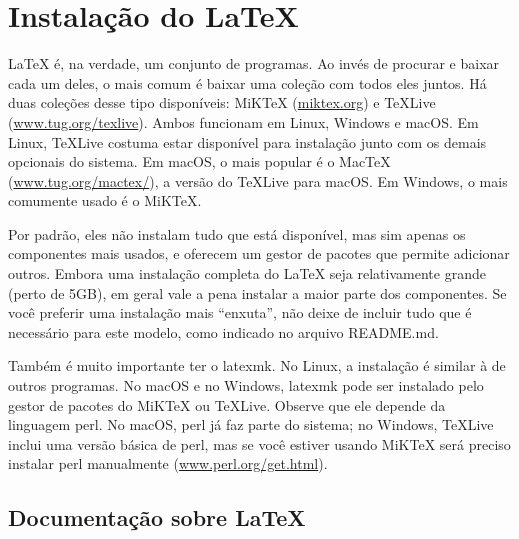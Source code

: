 
\chapter{Instalação do \LaTeX{}}
\label{chap:install}

\LaTeX{} é, na verdade, um conjunto de programas. Ao invés de procurar e
baixar cada um deles, o mais comum é baixar uma coleção com todos eles juntos.
Há duas coleções desse tipo disponíveis: MiK\TeX{} (\url{miktex.org}) e
\TeX{}Live (\url{www.tug.org/texlive}). Ambos funcionam em Linux, Windows e
macOS. Em Linux, \TeX{}Live costuma estar disponível para instalação junto
com os demais opcionais do sistema. Em macOS, o mais popular é o Mac\TeX{}
(\url{www.tug.org/mactex/}), a versão do \TeX{}Live para macOS. Em Windows,
o mais comumente usado é o MiK\TeX{}.

Por padrão, eles não instalam tudo que está disponível, mas sim apenas os
componentes mais usados, e oferecem um gestor de pacotes que permite adicionar
outros. Embora uma instalação completa do \LaTeX{} seja relativamente grande
(perto de 5GB), em geral vale a pena instalar a maior parte dos componentes.
Se você preferir uma instalação mais ``enxuta'', não deixe de incluir tudo
que é necessário para este modelo, como indicado no arquivo README.md.

Também é muito importante ter o \textsf{latexmk}. No Linux, a instalação
é similar à de outros programas. No macOS e no Windows, \textsf{latexmk}
pode ser instalado pelo gestor de pacotes do MiK\TeX{} ou \TeX{}Live.
Observe que ele depende da linguagem \textsf{perl}. No macOS, \textsf{perl}
já faz parte do sistema; no Windows, \TeX{}Live inclui uma versão básica
de perl, mas se você estiver usando MiK\TeX{} será preciso instalar
\textsf{perl} manualmente (\url{www.perl.org/get.html}).

\enlargethispage{.8\baselineskip}

\section{Documentação sobre \LaTeX}
\label{sec:docs}

